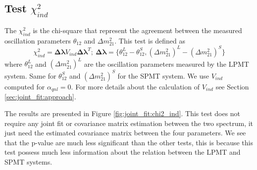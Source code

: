 \documentclass[../main.tex]{subfiles}
\begin{document}
\subsection{Test $\chi^2_{ind}$}

The $\chi^2_{ind}$ is the chi-square that represent the agreement between the measured oscillation parameters $\theta_{12}$ and $\Delta m^2_{21}$. This test is defined as
\begin{equation}
  \chi^2_{ind} = \bm{\Delta \lambda} V_{ind} \bm{\Delta \lambda}^T; ~ \bm{\Delta \lambda} = \{\theta_{12}^L - \theta_{12}^S, (\Delta m^2_{21})^L - (\Delta m^2_{21})^S\}
\end{equation}
where $\theta^L_{12}$ and $(\Delta m^2_{21})^L$ are the oscillation parameters measured by the LPMT system. Same for $\theta_{12}^S$ and $(\Delta m^2_{21})^S$ for the SPMT system. We use $V_{ind}$ computed for $\alpha_{qnl} = 0$. For more details about the calculation of $V_{ind}$ see Section \ref{sec:joint_fit:approach}.

The results are presented in Figure \ref{fig:joint_fit:chi2_ind}. This test does not require any joint fit or covariance matrix estimation between the two spectrum, it just need the estimated covariance matrix between the four parameters. We see that the p-value are much less significant than the other tests, this is because this test possess much less information about the relation between the LPMT and SPMT systems.
\end{document}
